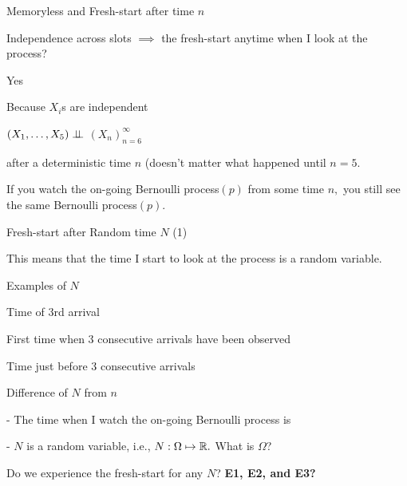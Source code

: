 \begin{frame}{Memoryless and Fresh-start after  time $n$}

Independence across slots $\implies$ the fresh-start anytime
when I look at the process?


  \plitemsep 0.05in

\bci
\item<2-> Yes

\item<2-> Because $X_i$s are independent

\eci

\medskip
{}
\bci
\item<4-> $(X_1, \ldots, X_5) \perp \!\!\! \perp$  $(X_n)_{n=6}^\infty$
\item<5->  after a deterministic time $n$ (doesn't
  matter what happened until $n=5$.
  
\item<6-> If you watch the on-going Bernoulli process$(p)$ from some time $n,$ you still see the same Bernoulli process$(p).$
\eci

\end{frame}
\begin{frame}{Fresh-start after Random time $N$ (1)}


\vspace{-0.3cm}
\plitemsep 0.03in
\bci
\item<1-> This means that the time I start to look at the process is a
  random variable.

\item<2-> Examples of $N$
{
\small
\bce[\bf E1.]
\item<3-> Time of 3rd arrival
\item<4-> First time when 3 consecutive arrivals have been observed
\item<5-> Time just before 3 consecutive arrivals
\ece
}
{
\vspace{-0.7cm}
\centering
{}
}

\item<6-> Difference of $N$ from $n$

- The time when I watch the on-going Bernoulli process is 

- $N$ is a random variable, i.e., $N: \Omega \mapsto {\mathbb R}.$
  What is $\Omega$?

\item<7-> Do we experience the fresh-start for any $N$? {\bf E1, E2, and E3?}
\eci

\end{frame}

